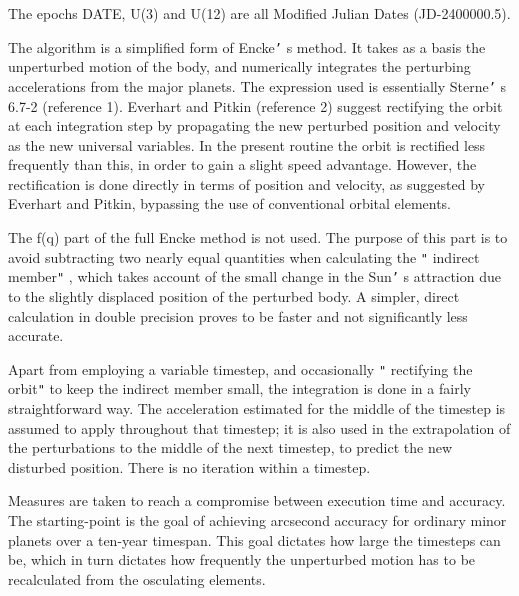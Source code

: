\documentclass[twoside,11pt,nolof]{starlink}
\begin{document}
{{{         \sstitem
          The epochs DATE, U(3) and U(12) are all Modified Julian Dates
           (JD-2400000.5).

         \sstitem
          The algorithm is a simplified form of Encke\texttt{'} s method.  It takes as
           a basis the unperturbed motion of the body, and numerically
           integrates the perturbing accelerations from the major planets.
           The expression used is essentially Sterne\texttt{'} s 6.7-2 (reference 1).
           Everhart and Pitkin (reference 2) suggest rectifying the orbit at
           each integration step by propagating the new perturbed position
           and velocity as the new universal variables.  In the present
           routine the orbit is rectified less frequently than this, in order
           to gain a slight speed advantage.  However, the rectification is
           done directly in terms of position and velocity, as suggested by
           Everhart and Pitkin, bypassing the use of conventional orbital
           elements.

      }
        The f(q) part of the full Encke method is not used.  The purpose
        of this part is to avoid subtracting two nearly equal quantities
        when calculating the \texttt{"} indirect member\texttt{"} , which takes account of the
        small change in the Sun\texttt{'} s attraction due to the slightly displaced
        position of the perturbed body.  A simpler, direct calculation in
        double precision proves to be faster and not significantly less
        accurate.

        Apart from employing a variable timestep, and occasionally
        \texttt{"} rectifying the orbit\texttt{"}  to keep the indirect member small, the
        integration is done in a fairly straightforward way.  The
        acceleration estimated for the middle of the timestep is assumed
        to apply throughout that timestep;  it is also used in the
        extrapolation of the perturbations to the middle of the next
        timestep, to predict the new disturbed position.  There is no
        iteration within a timestep.

        Measures are taken to reach a compromise between execution time
        and accuracy.  The starting-point is the goal of achieving
        arcsecond accuracy for ordinary minor planets over a ten-year
        timespan.  This goal dictates how large the timesteps can be,
        which in turn dictates how frequently the unperturbed motion has
        to be recalculated from the osculating elements.

}}
\end{document}
